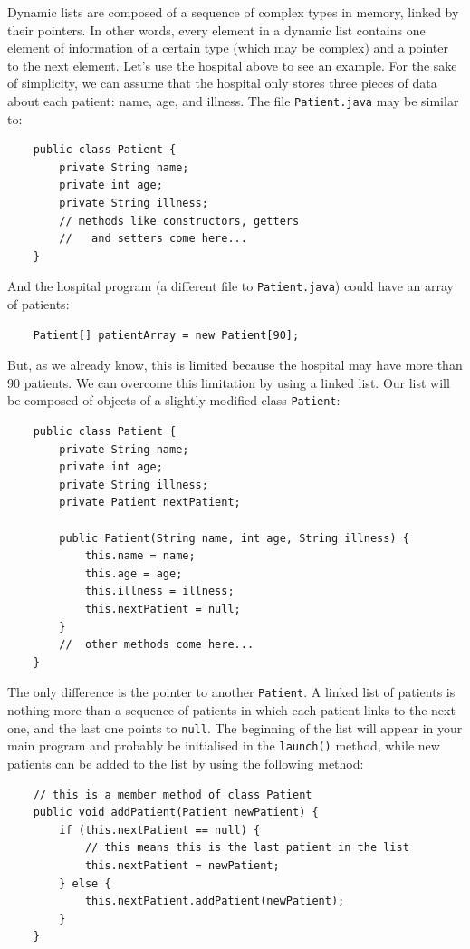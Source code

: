 Dynamic lists are composed of a sequence of complex types in memory,
linked by their pointers. In other words, every element in a dynamic
list contains one element of information of a certain type (which may
be complex) and a pointer to the next element. Let's use the hospital
above to see an example. For the sake of simplicity, we can assume
that the hospital only stores three pieces of data about each patient:
name, age, and illness. The file \verb+Patient.java+ may be similar to:

\begin{verbatim}
    public class Patient {
        private String name;
        private int age;
        private String illness;
        // methods like constructors, getters 
        //   and setters come here...
    }
\end{verbatim}

And the hospital program (a different file to \verb+Patient.java+)
could have an array of patients:  

\begin{verbatim}
    Patient[] patientArray = new Patient[90];
\end{verbatim}

But, as we already know, this is limited because the hospital may have
more than 90 patients. We can overcome this limitation by using a
linked list. Our list will be composed of objects of a slightly
modified class \verb+Patient+:

\begin{verbatim}
    public class Patient {
        private String name;
        private int age;
        private String illness;
        private Patient nextPatient;

        public Patient(String name, int age, String illness) {
            this.name = name;
            this.age = age;
            this.illness = illness;
            this.nextPatient = null;
        }
        //  other methods come here...
    }
\end{verbatim}

The only difference is the pointer to another \verb+Patient+. A linked
list of patients is nothing more than a sequence of patients in which
each patient links to the next one, and the last one 
points to \verb+null+. The beginning of the list will
appear in your main program and probably be initialised in the
\verb+launch()+ method, while new patients can be added to the list by
using the following method: 

\begin{verbatim}
    // this is a member method of class Patient
    public void addPatient(Patient newPatient) {
        if (this.nextPatient == null) {
            // this means this is the last patient in the list
            this.nextPatient = newPatient;
        } else {
            this.nextPatient.addPatient(newPatient);
        }
    }            
\end{verbatim}

